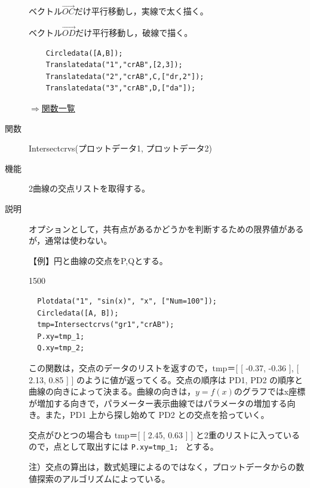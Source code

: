 \documentclass[papersize,a4paper,12pt,uplatex]{jsarticle}
\begin{document}
\begin{description}
ベクトル$\overrightarrow{OC} $だけ平行移動し，実線で太く描く。

ベクトル$\overrightarrow{OD} $だけ平行移動し，破線で描く。

\begin{verbatim}
    Circledata([A,B]);
    Translatedata("1","crAB",[2,3]);
    Translatedata("2","crAB",C,["dr,2"]);
    Translatedata("3","crAB",D,["da"]);
\end{verbatim}
\vspace{\baselineskip}
              \begin{center}  \end{center}


\begin{flushright}  \hyperlink{functionlist}{$\Rightarrow$関数一覧}\end{flushright}

\vspace{\baselineskip}
\hypertarget{intersectcrvs}{}
\item[関数]  Intersectcrvs(プロットデータ1, プロットデータ2)
\item[機能]  2曲線の交点リストを取得する。
\item[説明]  オプションとして，共有点があるかどうかを判断するための限界値があるが，通常は使わない。

\vspace{\baselineskip}
【例】円と曲線の交点をP,Qとする。

\begin{layer}{150}{0}
\end{layer}

\begin{verbatim}
  Plotdata("1", "sin(x)", "x", ["Num=100"]);
  Circledata([A, B]);
  tmp=Intersectcrvs("gr1","crAB");
  P.xy=tmp_1;
  Q.xy=tmp_2;
 \end{verbatim}

この関数は，交点のデータのリストを返すので，tmp＝[ [ -0.37, -0.36 ], [ 2.13, 0.85 ] ] のように値が返ってくる。交点の順序は PD1, PD2 の順序と曲線の向きによって決まる。曲線の向きは，$y=f(x)$のグラフではx座標が増加する向きで，パラメーター表示曲線ではパラメータの増加する向き。また，PD1 上から探し始めて PD2 との交点を拾っていく。

交点がひとつの場合も tmp＝[ [ 2.45, 0.63 ] ] と2重のリストに入っているので，点として取出すには \verb|P.xy=tmp_1; |  とする。

\vspace{\baselineskip}
注）交点の算出は，数式処理によるのではなく，プロットデータからの数値探索のアルゴリズムによっている。


\end{description}
\end{document}
